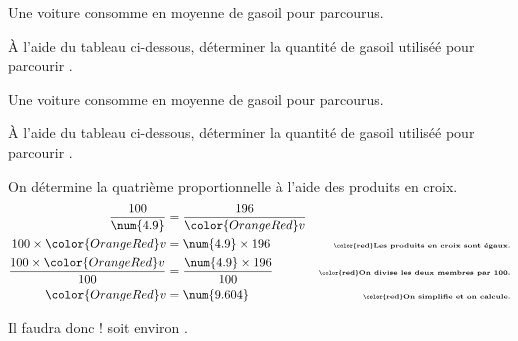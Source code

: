 \begin{exercice*}
    Une voiture consomme en moyenne  de gasoil pour  parcourus.\par
    À l'aide du tableau ci-dessous, déterminer la quantité de gasoil utiliséé pour parcourir .
    \begin{center}
        \Propor[Math,Stretch=1.2,GrandeurA=\phantom{Distance en \Lg[km]{}},GrandeurB=\phantom{Quantité de gasoil en \Capa[L]{}},CouleurTab=LightGray]{/,/}        
    \end{center}
\end{exercice*}
\begin{corrige}
    Une voiture consomme en moyenne  de gasoil pour  parcourus.\par
    À l'aide du tableau ci-dessous, déterminer la quantité de gasoil utiliséé pour parcourir .
    \begin{center}
    \end{center}
    {\color{red}
    On détermine la quatrième proportionnelle à l'aide des produits en croix.
        \begin{align*}
            \dfrac{100}{\num{4.9}}                      &=\dfrac{196}{\color{OrangeRed} v} &\\
            100\times {\color{OrangeRed} v}             &= \num{4.9}\times 196             &\text{\tiny\bfseries\color{red}Les produits en croix sont égaux.}\\
            \dfrac{100\times {\color{OrangeRed} v}}{100}&= \dfrac{\num{4.9}\times 196}{100}&\text{\tiny\bfseries\color{red}On divise les deux membres par 100.}\\
            {\color{OrangeRed} v}                       &=\num{9.604}                      &\text{\tiny\bfseries\color{red}On simplifie et on calcule.}
        \end{align*}
        \par\smallskip
        Il faudra donc  ! soit environ .
    }
\end{corrige}

